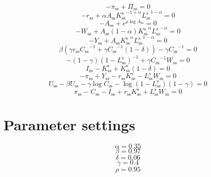 \begin{equation}
-\pi_\mathrm{ss} + \Pi_\mathrm{ss} = 0
\end{equation}
\begin{equation}
-r_\mathrm{ss} + {\alpha} {A_\mathrm{ss}} {{K^{\mathrm{s}}_\mathrm{ss}}^{-1 + \alpha}} {{L^{\mathrm{s}}_\mathrm{ss}}^{1 - \alpha}} = 0
\end{equation}
\begin{equation}
-A_\mathrm{ss} + e^{{\rho} {\log{A_\mathrm{ss}}}} = 0
\end{equation}
\begin{equation}
-W_\mathrm{ss} + {A_\mathrm{ss}} \left(1 - \alpha\right) {{K^{\mathrm{s}}_\mathrm{ss}}^{\alpha}} {{L^{\mathrm{s}}_\mathrm{ss}}^{-\alpha}} = 0
\end{equation}
\begin{equation}
-Y_\mathrm{ss} + {A_\mathrm{ss}} {{K^{\mathrm{s}}_\mathrm{ss}}^{\alpha}} {{L^{\mathrm{s}}_\mathrm{ss}}^{1 - \alpha}} = 0
\end{equation}
\begin{equation}
{\beta} \left({\gamma} {r_\mathrm{ss}} {C_\mathrm{ss}}^{-1} + {\gamma} {C_\mathrm{ss}}^{-1} \left(1 - \delta\right)\right) - {\gamma} {C_\mathrm{ss}}^{-1} = 0
\end{equation}
\begin{equation}
-\left(1 - \gamma\right) \left(1 - L^{\mathrm{s}}_\mathrm{ss}\right)^{-1} + {\gamma} {C_\mathrm{ss}}^{-1} {W_\mathrm{ss}} = 0
\end{equation}
\begin{equation}
I_\mathrm{ss} - K^{\mathrm{s}}_\mathrm{ss} + {K^{\mathrm{s}}_\mathrm{ss}} \left(1 - \delta\right) = 0
\end{equation}
\begin{equation}
-\pi_\mathrm{ss} + Y_\mathrm{ss} - {r_\mathrm{ss}} {K^{\mathrm{s}}_\mathrm{ss}} - {L^{\mathrm{s}}_\mathrm{ss}} {W_\mathrm{ss}} = 0
\end{equation}
\begin{equation}
U_\mathrm{ss} - {\beta} {U_\mathrm{ss}} - {\gamma} {\log{C_\mathrm{ss}}} - {\log\left(1 - L^{\mathrm{s}}_\mathrm{ss}\right)} \left(1 - \gamma\right) = 0
\end{equation}
\begin{equation}
\pi_\mathrm{ss} - C_\mathrm{ss} - I_\mathrm{ss} + {r_\mathrm{ss}} {K^{\mathrm{s}}_\mathrm{ss}} + {L^{\mathrm{s}}_\mathrm{ss}} {W_\mathrm{ss}} = 0
\end{equation}






\section{Parameter settings}

\begin{equation}
\alpha = 0.35
\end{equation}
\begin{equation}
\beta = 0.97
\end{equation}
\begin{equation}
\delta = 0.06
\end{equation}
\begin{equation}
\gamma = 0.4
\end{equation}
\begin{equation}
\rho = 0.95
\end{equation}


